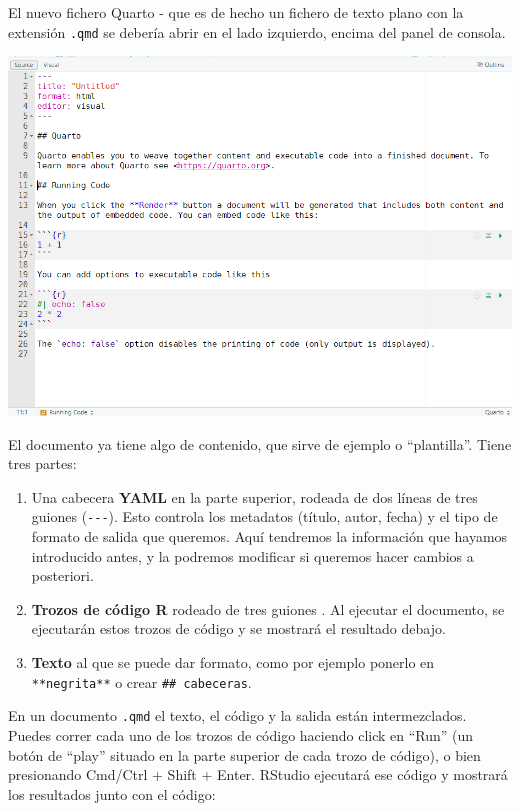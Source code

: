 \documentclass[
  letterpaper,
  DIV=11,
  numbers=noendperiod]{scrreprt}
\providecommand{\tightlist}{%
  \setlength{\itemsep}{0pt}\setlength{\parskip}{0pt}}\usepackage{longtable,booktabs,array}
\begin{document}
El nuevo fichero Quarto - que es de hecho un fichero de texto plano con
la extensión \texttt{.qmd} se debería abrir en el lado izquierdo, encima
del panel de consola.

\includegraphics{images/02-intro-rmarkdown/start_quarto.png}

El documento ya tiene algo de contenido, que sirve de ejemplo o
``plantilla''. Tiene tres partes:

\begin{enumerate}
\def\labelenumi{\arabic{enumi}.}
\tightlist
\item
  Una cabecera \textbf{YAML} en la parte superior, rodeada de dos líneas
  de tres guiones (\texttt{-\/-\/-}). Esto controla los metadatos
  (título, autor, fecha) y el tipo de formato de salida que queremos.
  Aquí tendremos la información que hayamos introducido antes, y la
  podremos modificar si queremos hacer cambios a posteriori.
\item
  \textbf{Trozos de código R} rodeado de tres guiones
  \texttt{\textasciigrave{}\textasciigrave{}\textasciigrave{}}. Al
  ejecutar el documento, se ejecutarán estos trozos de código y se
  mostrará el resultado debajo.
\item
  \textbf{Texto} al que se puede dar formato, como por ejemplo ponerlo
  en \texttt{**negrita**} o crear \texttt{\#\#\ cabeceras}.
\end{enumerate}

En un documento \texttt{.qmd} el texto, el código y la salida están
intermezclados. Puedes correr cada uno de los trozos de código haciendo
click en ``Run'' (un botón de ``play'' situado en la parte superior de
cada trozo de código), o bien presionando Cmd/Ctrl + Shift + Enter.
RStudio ejecutará ese código y mostrará los resultados junto con el
código:
\end{document}
